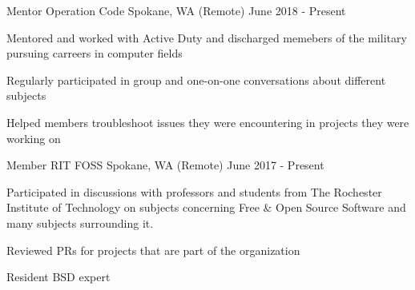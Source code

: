 

\begin{cventries}

  \cventry
    {Mentor} %
    {Operation Code} %
    {Spokane, WA (Remote)} %
    {June 2018 - Present} %
    {
      \begin{cvitems} %
        \item {Mentored and worked with Active Duty and discharged memebers of the military pursuing carreers in computer fields}
        \item {Regularly participated in group and one-on-one conversations about different subjects}
        \item {Helped members troubleshoot issues they were encountering in projects they were working on}
      \end{cvitems}
    }

  \cventry
    {Member} %
    {RIT FOSS} %
    {Spokane, WA (Remote)} %
    {June 2017 - Present} %
    {
      \begin{cvitems} %
      \item {Participated in discussions with professors and students from The Rochester Institute of Technology on subjects concerning Free \& Open Source Software and many subjects surrounding it.}
      \item {Reviewed PRs for projects that are part of the organization}
      \item {Resident BSD expert}
      \end{cvitems}
    }

\end{cventries}
